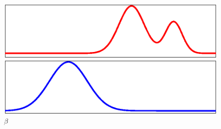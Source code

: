 \documentclass[cn,10pt,math=newtx,citestyle=gb7714-2015,bibstyle=gb7714-2015]{elegantbook}
\begin{document}
\begin{figure}[H]
	\centering
	\begin{minipage}{0.8\linewidth}
	
	\centering
	\begin{minipage}{0.40\linewidth}
		\centering
		\includegraphics[width=0.95\linewidth]{figure/fig4.4/input-1.eps}
		\caption*{$\alpha$}
	\end{minipage}
	\begin{minipage}{0.40\linewidth}
		\centering
		\includegraphics[width=0.95\linewidth]{figure/fig4.4/input-2.eps}
		\caption*{$\beta$}
	\end{minipage}
	\vspace{1em}
	

\end{minipage}
\end{figure}
\end{document}
